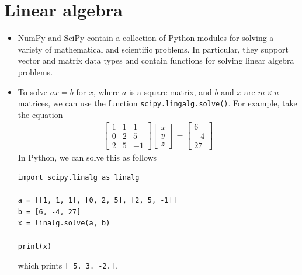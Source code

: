 \documentclass[a4paper,twoside,titlepage]{memoir}
\newcommand{\shellcmd}{\texttt}
\begin{document}
\section{Linear algebra}
\begin{itemize}
\item NumPy and SciPy contain a collection of Python modules for solving a variety of mathematical and scientific problems.  In particular, they support vector and matrix data types and contain functions for solving linear algebra problems.
\item To solve $a x = b$ for $x$, where $a$ is a square matrix, and $b$ and $x$ are $m \times n$ matrices, we can use the function \shellcmd{scipy.lingalg.solve()}.  For example, take the equation
\begin{align*}
\begin{bmatrix}
1 & 1 & 1  \\
0 & 2 & 5  \\
2 & 5 & -1
\end{bmatrix}
\begin{bmatrix}
x \\
y \\
z
\end{bmatrix}
=
\begin{bmatrix}
6 \\
-4 \\
27
\end{bmatrix}
\end{align*}
In Python, we can solve this as follows
\begin{verbatim}
import scipy.linalg as linalg

a = [[1, 1, 1], [0, 2, 5], [2, 5, -1]]                                          
b = [6, -4, 27]
x = linalg.solve(a, b)

print(x)
\end{verbatim}
which prints \shellcmd{[ 5.  3. -2.]}.
\end{itemize}
\end{document}

